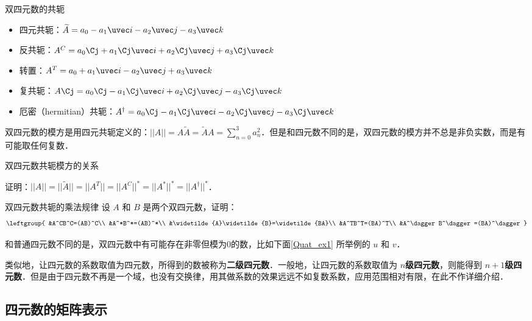 \begin{definition}{双四元数的共轭}
\begin{itemize}
\item 四元共轭：$\widetilde{A}=a_0-a_1\uvec i-a_2\uvec j-a_3\uvec k$
\item 反共轭：$A^C=a_0\Cj + a_1\Cj\uvec i+a_2\Cj\uvec j+a_3\Cj\uvec k$
\item 转置：$A^T=a_0+a_1\uvec i-a_2\uvec j+a_3\uvec k$
\item 复共轭：$A\Cj=a_0\Cj-a_1\Cj\uvec i+a_2\Cj\uvec j-a_3\Cj\uvec k$
\item 厄密（hermitian）共轭：$A^\dagger=a_0\Cj-a_1\Cj\uvec i-a_2\Cj\uvec j-a_3\Cj\uvec k$
\end{itemize}
\end{definition}

双四元数的模方是用四元共轭定义的：$||A||=A\widetilde{A}=\widetilde{A}A=\sum^{3}_{n=0}a^2_n$．但是和四元数不同的是，双四元数的模方并不总是非负实数，而是有可能取任何复数．

\begin{exercise}{双四元数共轭模方的关系}

证明：$||A||=||\widetilde{A}||=||A^T||=||A^C||^*=||A^*||^*=||A^\dagger||^*$．

\end{exercise}

\begin{exercise}{双四元数共轭的乘法规律}
设 $A$ 和 $B$ 是两个双四元数，证明：
\begin{equation}
\leftgroup{
&A^CB^C=(AB)^C\\
&A^*B^*=(AB)^*\\
&\widetilde{A}\widetilde{B}=\widetilde{BA}\\
&A^TB^T=(BA)^T\\
&A^\dagger B^\dagger=(BA)^\dagger
}
\end{equation}

\end{exercise}

和普通四元数不同的是，双四元数中有可能存在非零但模为0的数，比如下面\autoref{Quat_ex1} 所举例的 $u$ 和 $v$．

类似地，让四元数的系数取值为四元数，所得到的数被称为\textbf{二级四元数}．一般地，让四元数的系数取值为 $n$\textbf{级四元数}，则能得到 $n+1$\textbf{级四元数}．但是由于四元数不再是一个域，也没有交换律，用其做系数的效果远远不如复数系数，应用范围相对有限，在此不作详细介绍．


\subsection{四元数的矩阵表示}

